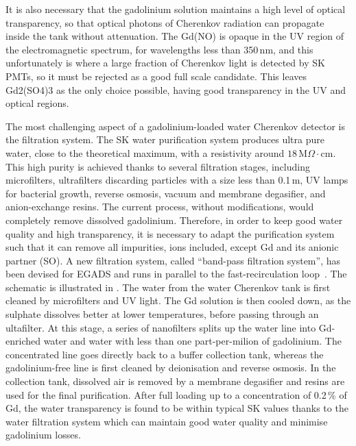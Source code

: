 It is also necessary that the gadolinium solution maintains a high level of optical transparency, %
so that optical photons of Cherenkov radiation can propagate inside the tank without attenuation.
The Gd(NO) is opaque in the UV region of the electromagnetic spectrum, for wavelengths less than 350\,nm, %
and this unfortunately is where a large fraction of Cherenkov light is detected by SK PMTs, %
so it must be rejected as a good full scale candidate.
This leaves Gd2(SO4)3 as the only choice possible, having good transparency in the UV and optical regions.

The most challenging aspect of a gadolinium-loaded water Cherenkov detector is the filtration system.
The SK water purification system produces ultra pure water, close to the theoretical maximum, %
with a resistivity around $18$\,M$\Omega\cdot$cm.
This high purity is achieved thanks to several filtration stages, including microfilters, %
ultrafilters discarding particles with a size less than 0.1\,\textmu m, UV lamps for bacterial growth, %
reverse osmosis, vacuum and membrane degasifier, and anion-exchange resins.
The current process, without modifications, would completely remove dissolved gadolinium.
Therefore, in order to keep good water quality and high transparency, it is necessary to adapt the purification system %
such that it can remove all impurities, ions included, except Gd and its anionic partner (SO).
A new filtration system, called ``band-pass filtration system'', has been devised for EGADS and runs in parallel to %
the fast-recirculation loop~\cite{Ikeda:2019pcm}.
The schematic is illustrated in .
The water from the water Cherenkov tank is first cleaned by microfilters and UV light.
The Gd solution is then cooled down, as the sulphate dissolves better at lower temperatures, %
before passing through an ultafilter.
At this stage, a series of nanofilters splits up the water line into Gd-enriched water and %
water with less than one part-per-milion of gadolinium.
The concentrated line goes directly back to a buffer collection tank, whereas the gadolinium-free line %
is first cleaned by deionisation and reverse osmosis.
In the collection tank, dissolved air is removed by a membrane degasifier and resins are used %
for the final purification.
After full loading up to a concentration of 0.2\,\% of Gd, the water transparency is found to be within typical SK values %
thanks to the water filtration system which can maintain good water quality and minimise gadolinium losses.


